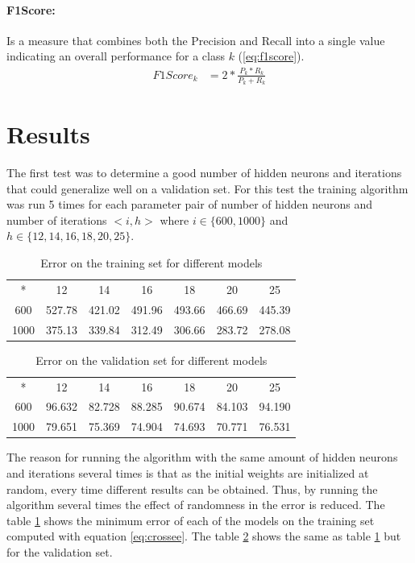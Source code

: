 \documentclass{IEEEtran}
\begin{document}
\paragraph{F1Score:} 
Is a measure that combines both the Precision and Recall into a single value indicating an overall performance for a class $k$ (\ref{eq:f1score}).
\begin{align}
F1Score_k &= 2 * \frac{P_k*R_k}{P_k+R_k} \label{eq:f1score}
\end{align}


\section{Results}

The first test was to determine a good number of hidden neurons and iterations that could generalize well
on a validation set. For this test the training algorithm was run 5 times for each parameter pair of number
of hidden neurons and number of iterations $<i,h>$ where $i \in \{600,1000\}$ and $h \in \{12,14,16,18,20,25\}$.

\begin{table}
\centering
\begin{tabular}{|c|c|c|c|c|c|c|}
\hline
* & 12 & 14 & 16 & 18 & 20 & 25 \\
600 & 527.78 & 421.02 & 491.96 & 493.66 & 466.69 & 445.39 \\
1000 & 375.13 & 339.84 & 312.49 & 306.66 & 283.72 & 278.08 \\ 
\hline
\end{tabular}
\caption{Error on the training set for different models}
\label{tb:terror}
\end{table}

\begin{table}
\centering
\begin{tabular}{|c|c|c|c|c|c|c|}
\hline
* & 12 & 14 & 16 & 18 & 20 & 25 \\
600 & 96.632 & 82.728 & 88.285 & 90.674 & 84.103 & 94.190 \\
1000 & 79.651 & 75.369 & 74.904 & 74.693 & 70.771 & 76.531 \\ 
\hline
\end{tabular}
\caption{Error on the validation set for different models}
\label{tb:verror}
\end{table}

The reason for running the algorithm with the same amount of hidden neurons and iterations several times is
that as the initial weights are initialized at random, every time different results can be obtained. Thus,
by running the algorithm several times the effect of randomness in the error is reduced. The table
\ref{tb:terror} shows the minimum error of each of the models on the training set computed with equation \ref{eq:crossee}.
The table \ref{tb:verror} shows the same as table \ref{tb:terror} but for the validation set.
\end{document}
